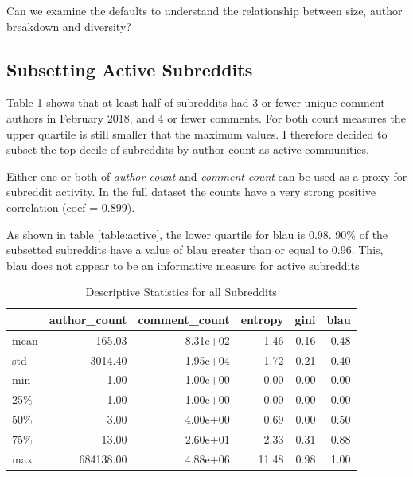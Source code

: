 \documentclass{article}
\begin{document}
Can we examine the defaults to understand the relationship between size, author breakdown and diversity?



\subsection{Subsetting Active Subreddits}
Table \ref{table:all} shows that at least half of subreddits had 3 or fewer unique comment authors in February 2018, and 4 or fewer comments. For both count measures the upper quartile is still smaller that the maximum values. I therefore decided to subset the top decile of subreddits by author count as active communities.

Either one or both of \textit{author count} and \textit{comment count} can be used as a proxy for subreddit activity. In the full dataset the counts have a very strong positive correlation (coef = 0.899). 

As shown in table \ref{table:active}, the lower quartile for blau is 0.98. 90\% of the subsetted subreddits have a value of blau greater than or equal to 0.96.  This, blau does not appear to be an informative measure for active subreddits




\begin{table}
\centering
\begin{tabular}{lrrrrr}
\toprule
{} &  author\_count &  comment\_count &  entropy &  gini &  blau \\
\midrule
mean &        165.03 &       8.31e+02 &     1.46 &  0.16 &  0.48 \\
std  &       3014.40 &       1.95e+04 &     1.72 &  0.21 &  0.40 \\
min  &          1.00 &       1.00e+00 &     0.00 &  0.00 &  0.00 \\
25\%  &          1.00 &       1.00e+00 &     0.00 &  0.00 &  0.00 \\
50\%  &          3.00 &       4.00e+00 &     0.69 &  0.00 &  0.50 \\
75\%  &         13.00 &       2.60e+01 &     2.33 &  0.31 &  0.88 \\
max  &     684138.00 &       4.88e+06 &    11.48 &  0.98 &  1.00 \\
\bottomrule
\end{tabular}

\caption{Descriptive Statistics for all Subreddits}
\label{table:all} 
\end{table}
\end{document}
